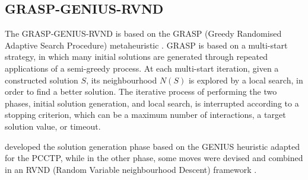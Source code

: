 \documentclass{singlecol-new}
\providecommand{\DIFdelbegin}{} %
\providecommand{\DIFdelend}{} %
\begin{document}
\DIFdelend \subsection{GRASP-GENIUS-RVND}

\DIFdelbegin %

\DIFdelend The GRASP-GENIUS-RVND \citep{daSilva} is based on the GRASP (Greedy Randomised Adaptive Search Procedure) metaheuristic \citep{grasp03}. GRASP is based on a multi-start strategy, in which many initial solutions are generated through repeated applications of a semi-greedy process. At each multi-start iteration, given a constructed solution $S$, its neighbourhood $N(S)$ is explored by a local search, in order to find a better solution. The iterative process of performing the two phases, initial solution generation, and local search, is interrupted according to a stopping criterion, which can be a maximum number of interactions, a target solution value, or timeout.

\DIFdelbegin %

\DIFdelend \citet{daSilva} developed the solution generation phase based on the GENIUS heuristic \citep{genius} adapted for the PCCTP, while in the other phase, some moves were devised and combined in an RVND (Random Variable neighbourhood Descent) framework \citep{mladenovic97}.


\DIFdelbegin %

\end{document}
